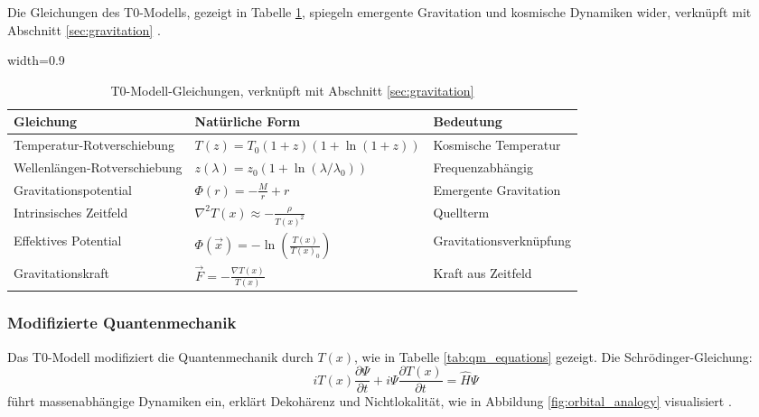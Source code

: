\documentclass[12pt,a4paper]{article}
\newcommand{\Tfield}{T(x)}
\newcommand{\tablescale}{0.9}
\begin{document}
	Die Gleichungen des T0-Modells, gezeigt in Tabelle \ref{tab:t0_equations}, spiegeln emergente Gravitation und kosmische Dynamiken wider, verknüpft mit Abschnitt \ref{sec:gravitation} \cite{pascher_emergente_2025}.
	
	\begin{table}[htbp]
		\centering
		\begin{adjustbox}{width=\tablescale\textwidth}
			\begin{tabular}{lll}
				\toprule
				\textbf{Gleichung} & \textbf{Natürliche Form} & \textbf{Bedeutung} \\
				\midrule
				Temperatur-Rotverschiebung & \(T(z) = T_0 (1+z)(1+\ln(1+z))\) & Kosmische Temperatur \\
				Wellenlängen-Rotverschiebung & \(z(\lambda) = z_0 (1+\ln(\lambda/\lambda_0))\) & Frequenzabhängig \\
				Gravitationspotential & \(\Phi(r) = -\frac{M}{r} + r\) & Emergente Gravitation \\
				Intrinsisches Zeitfeld & \(\nabla^2 \Tfield \approx -\frac{\rho}{\Tfield^2}\) & Quellterm \\
				Effektives Potential & \(\Phi(\vec{x}) = -\ln\left(\frac{\Tfield}{\Tfield_0}\right)\) & Gravitationsverknüpfung \\
				Gravitationskraft & \(\vec{F} = -\frac{\nabla \Tfield}{\Tfield}\) & Kraft aus Zeitfeld \\
				\bottomrule
			\end{tabular}
		\end{adjustbox}
		\caption{T0-Modell-Gleichungen, verknüpft mit Abschnitt \ref{sec:gravitation}}
		\label{tab:t0_equations}
	\end{table}
	
	\subsubsection{Modifizierte Quantenmechanik}
	\label{subsec:quantum}
	
	Das T0-Modell modifiziert die Quantenmechanik durch \(\Tfield\), wie in Tabelle \ref{tab:qm_equations} gezeigt. Die Schrödinger-Gleichung:
	\[
	i \Tfield \frac{\partial \Psi}{\partial t} + i \Psi \frac{\partial \Tfield}{\partial t} = \hat{H} \Psi
	\]
	führt massenabhängige Dynamiken ein, erklärt Dekohärenz und Nichtlokalität, wie in Abbildung \ref{fig:orbital_analogy} visualisiert \cite{pascher_quantum_2025}.
	
\end{document}
